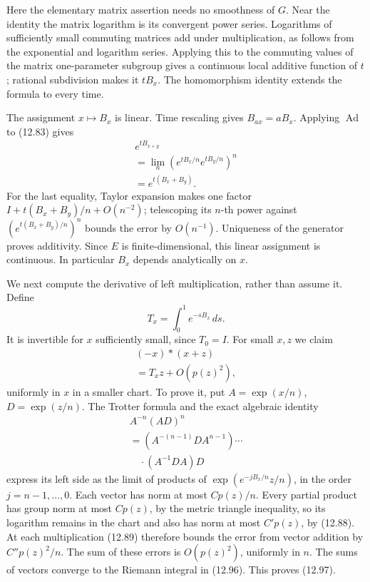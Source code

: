 \documentclass[
  11pt,
]{article}
\begin{document}
Here the elementary matrix assertion needs no smoothness of \(G\). Near
the identity the matrix logarithm is its convergent power series.
Logarithms of sufficiently small commuting matrices add under
multiplication, as follows from the exponential and logarithm series.
Applying this to the commuting values of the matrix one-parameter
subgroup gives a continuous local additive function of \(t\); rational
subdivision makes it \(tB_x\). The homomorphism identity extends the
formula to every time.

The assignment \(x\mapsto B_x\) is linear. Time rescaling gives
\(B_{ax}=aB_x\). Applying \(\operatorname{Ad}\) to (12.83) gives \[
\begin{gathered}
e^{tB_{x+y}}\\
=\lim_n(e^{tB_x/n}e^{tB_y/n})^n\\
=e^{t(B_x+B_y)}.
\end{gathered}
\tag{12.95}
\] For the last equality, Taylor expansion makes one factor
\(I+t(B_x+B_y)/n+O(n^{-2})\); telescoping its \(n\)-th power against
\((e^{t(B_x+B_y)/n})^n\) bounds the error by \(O(n^{-1})\). Uniqueness
of the generator proves additivity. Since \(E\) is finite-dimensional,
this linear assignment is continuous. In particular \(B_x\) depends
analytically on \(x\).

We next compute the derivative of left multiplication, rather than
assume it. Define \[
T_x=\int_0^1 e^{-sB_x}\,ds.
\tag{12.96}
\] It is invertible for \(x\) sufficiently small, since \(T_0=I\). For
small \(x,z\) we claim \[
\begin{gathered}
(-x)*(x+z)\\
=T_xz+O(p(z)^2),
\end{gathered}
\tag{12.97}
\] uniformly in \(x\) in a smaller chart. To prove it, put
\(A=\exp(x/n)\), \(D=\exp(z/n)\). The Trotter formula and the exact
algebraic identity \[
\begin{gathered}
A^{-n}(AD)^n\\
=(A^{-(n-1)}DA^{n-1})\cdots\\
\quad\cdot(A^{-1}DA)D
\end{gathered}
\tag{12.98}
\] express its left side as the limit of products of
\(\exp(e^{-jB_x/n}z/n)\), in the order \(j=n-1,\ldots,0\). Each vector
has norm at most \(C p(z)/n\). Every partial product has group norm at
most \(C p(z)\), by the metric triangle inequality, so its logarithm
remains in the chart and also has norm at most \(C' p(z)\), by (12.88).
At each multiplication (12.89) therefore bounds the error from vector
addition by \(C''p(z)^2/n\). The sum of these errors is \(O(p(z)^2)\),
uniformly in \(n\). The sums of vectors converge to the Riemann integral
in (12.96). This proves (12.97).
\end{document}
